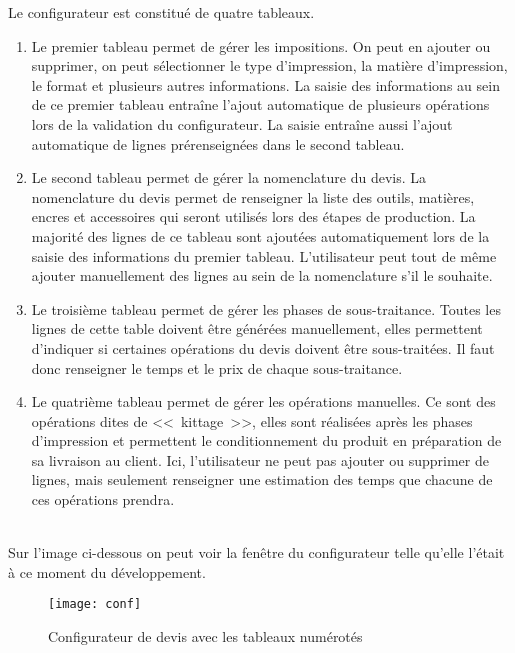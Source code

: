 Le configurateur est constitué de quatre tableaux.
\\
\begin{enumerate}
    \item Le premier tableau permet de gérer les impositions.
    On peut en ajouter ou supprimer, on peut sélectionner le type d'impression, la matière d'impression, le format et plusieurs autres informations.
    La saisie des informations au sein de ce premier tableau entraîne l'ajout automatique de plusieurs opérations lors de la validation du configurateur.
    La saisie entraîne aussi l'ajout automatique de lignes prérenseignées dans le second tableau.
    
    \item Le second tableau permet de gérer la nomenclature du devis.
    La nomenclature du devis permet de renseigner la liste des outils, matières, encres et accessoires qui seront utilisés lors des étapes de production.
    La majorité des lignes de ce tableau sont ajoutées automatiquement lors de la saisie des informations du premier tableau.
    L'utilisateur peut tout de même ajouter manuellement des lignes au sein de la nomenclature s'il le souhaite.
    
    \item Le troisième tableau permet de gérer les phases de sous-traitance.
    Toutes les lignes de cette table doivent être générées manuellement, elles permettent d'indiquer si certaines opérations du devis doivent être sous-traitées.
    Il faut donc renseigner le temps et le prix de chaque sous-traitance.
    
    \item Le quatrième tableau permet de gérer les opérations manuelles.
    Ce sont des opérations dites de <<~kittage~>>, elles sont réalisées après les phases d'impression et permettent le conditionnement du produit en préparation de sa livraison au client.
    Ici, l'utilisateur ne peut pas ajouter ou supprimer de lignes, mais seulement renseigner une estimation des temps que chacune de ces opérations prendra.
\end{enumerate}
~\\

Sur l'image ci-dessous on peut voir la fenêtre du configurateur telle qu'elle l'était à ce moment du développement.

\FloatBarrier
\begin{figure}[h!]
    \begin{center}
        \texttt{[image: conf]}
    \end{center}
    \caption{Configurateur de devis avec les tableaux numérotés}
    \label{figure:conf}
\end{figure}
\FloatBarrier

